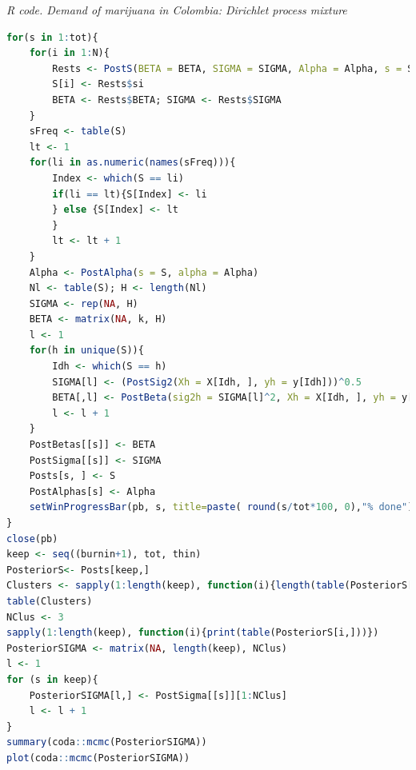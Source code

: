 \begin{tcolorbox}[enhanced,width=4.67in,center upper,
	fontupper=\large\bfseries,drop shadow southwest,sharp corners]
	\textit{R code. Demand of marijuana in Colombia: Dirichlet process mixture}
	\begin{VF}
		\begin{lstlisting}[language=R]
for(s in 1:tot){
	for(i in 1:N){
		Rests <- PostS(BETA = BETA, SIGMA = SIGMA, Alpha = Alpha, s = S, i = i)
		S[i] <- Rests$si
		BETA <- Rests$BETA; SIGMA <- Rests$SIGMA
	}
	sFreq <- table(S)
	lt <- 1
	for(li in as.numeric(names(sFreq))){
		Index <- which(S == li)
		if(li == lt){S[Index] <- li
		} else {S[Index] <- lt
		}
		lt <- lt + 1
	}
	Alpha <- PostAlpha(s = S, alpha = Alpha)
	Nl <- table(S); H <- length(Nl)
	SIGMA <- rep(NA, H)
	BETA <- matrix(NA, k, H)
	l <- 1
	for(h in unique(S)){
		Idh <- which(S == h)
		SIGMA[l] <- (PostSig2(Xh = X[Idh, ], yh = y[Idh]))^0.5
		BETA[,l] <- PostBeta(sig2h = SIGMA[l]^2, Xh = X[Idh, ], yh = y[Idh])
		l <- l + 1
	}
	PostBetas[[s]] <- BETA
	PostSigma[[s]] <- SIGMA
	Posts[s, ] <- S
	PostAlphas[s] <- Alpha
	setWinProgressBar(pb, s, title=paste( round(s/tot*100, 0),"% done"))
}
close(pb)
keep <- seq((burnin+1), tot, thin)
PosteriorS<- Posts[keep,]
Clusters <- sapply(1:length(keep), function(i){length(table(PosteriorS[i,]))})
table(Clusters)
NClus <- 3
sapply(1:length(keep), function(i){print(table(PosteriorS[i,]))})
PosteriorSIGMA <- matrix(NA, length(keep), NClus)
l <- 1
for (s in keep){
	PosteriorSIGMA[l,] <- PostSigma[[s]][1:NClus]
	l <- l + 1
}
summary(coda::mcmc(PosteriorSIGMA))
plot(coda::mcmc(PosteriorSIGMA))
\end{lstlisting}
	\end{VF}
\end{tcolorbox}

